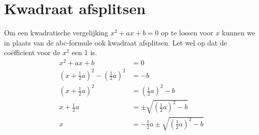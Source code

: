 \documentclass{article}
\begin{document}
	\section{Kwadraat afsplitsen}
        Om een kwadratische vergelijking $x^2 + ax + b = 0$ op te lossen voor $x$ kunnen we in plaats van de abc-formule ook kwadraat afsplitsen. Let wel op dat de co\"efficient voor de $x^2$ een 1 is.
        \begin{align*}
            x^2 + a x + b &= 0 \\
            \left(x + \frac{1}{2} a\right)^2 - \left( \frac{1}{2}a \right)^2 &= - b \\
            \left(x + \frac{1}{2} a\right)^2 &= \left( \frac{1}{2}a \right)^2 - b \\
            x + \frac{1}{2} a &= \pm \sqrt{\left( \frac{1}{2}a \right)^2 - b} \\
            x &= -  \frac{1}{2} a \pm \sqrt{\left(\frac{1}{2}a \right)^2 - b}
        \end{align*}
\end{document}
